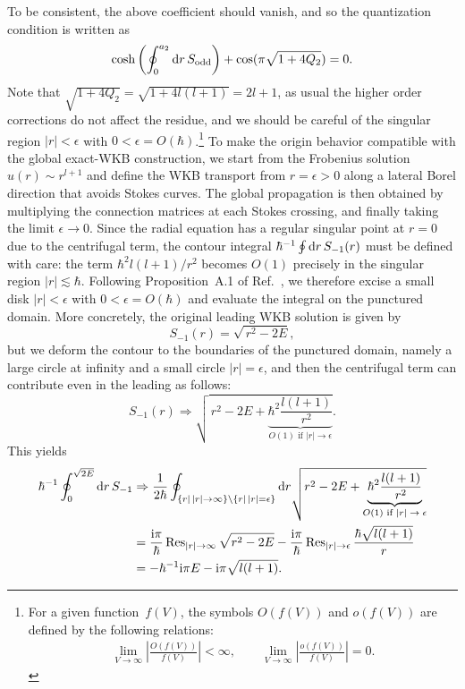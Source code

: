 To be consistent, the above coefficient should vanish, and so the quantization condition is written as
\begin{align}
    \cosh\left(\oint_{0}^{a_2} \mathrm{d} r\, S_{\mathrm{odd}}\right)
    + \cos(\pi\sqrt{1+4Q_2}) = 0 .
    \label{src:2510_11766:eq:oscillator_quantization_condition}
\end{align}
Note that $\sqrt{1+4Q_2}=\sqrt{1+4l(l+1)}=2l+1$, as usual the higher order corrections do not affect the residue, and we should be careful of the singular region $|r|<\epsilon$ with $0<\epsilon=O(\hbar)$.\footnote{%
For a given function~$f(V)$, the symbols $O(f(V))$ and $o(f(V))$ are defined by the following relations:
\begin{align}
\lim_{V\to\infty}\left|\frac{O(f(V))}{f(V)}\right|<\infty,\qquad\lim_{V\to\infty}\left|\frac{o(f(V))}{f(V)}\right|=0.
\end{align}
}
To make the origin behavior compatible with the global exact-WKB construction, we start from the Frobenius solution
$u(r)\sim r^{l+1}$ and define the WKB transport from $r=\epsilon>0$ along a lateral Borel direction that avoids Stokes curves.
The global propagation is then obtained by multiplying the connection matrices at each Stokes crossing, and finally taking the limit
$\epsilon\to 0$.
Since the radial equation has a regular singular point at \(r=0\) due to the centrifugal term, the contour integral
$\hbar^{-1}\oint \mathrm{d} r\, S_{-1}(r)$ must be defined with care: the term $\hbar^{2}l(l+1)/r^{2}$ becomes $O(1)$ precisely in the
singular region $|r|\lesssim \hbar$.
Following Proposition~A.1 of Ref.~\cite{Miyachi:2025ptm}, we therefore excise a small disk $|r|<\epsilon$ with
$0<\epsilon=O(\hbar)$ and evaluate the integral on the punctured domain.
More concretely, the original leading WKB solution is given by
\begin{equation}
S_{-1}(r)=\sqrt{\,r^{2}-2E},
\end{equation}
but we deform the contour to the boundaries of the punctured domain, namely a large circle at infinity and a small circle $|r|=\epsilon$, and then the centrifugal term can contribute even in the leading as follows:
\begin{equation}
S_{-1}(r)\Rightarrow\sqrt{\,r^{2}-2E+\underbrace{\hbar^2\frac{l(l+1)}{r^2}}_{\text{$O(1)$ if $|r|\to\epsilon$}}} .
\end{equation}
This yields
\begin{align}
    \hbar^{-1}\oint_{0}^{\sqrt{2E}} \mathrm{d} r\, S_{-1}
    &\Rightarrow \frac{1}{2\hbar} \oint_{\{r|\,|r|\to\infty\}\setminus\{r|\,|r|=\epsilon\}} \mathrm{d} r
    \sqrt{r^2 - 2E + \underbrace{\hbar^2\frac{l(l+1)}{r^2}}_{\text{$O(1)$ if $|r|\to\epsilon$}}}\\
    &= \frac{\mathrm{i}\pi}{\hbar} \operatorname{Res}_{|r|\to\infty} \sqrt{r^2 - 2E}
        - \frac{\mathrm{i}\pi}{\hbar} \operatorname{Res}_{|r|\to\epsilon} \frac{\hbar\sqrt{l(l+1)}}{r}\\
    &= - \hbar^{-1} \mathrm{i} \pi E - \mathrm{i} \pi \sqrt{l(l+1)} .
\end{align}
